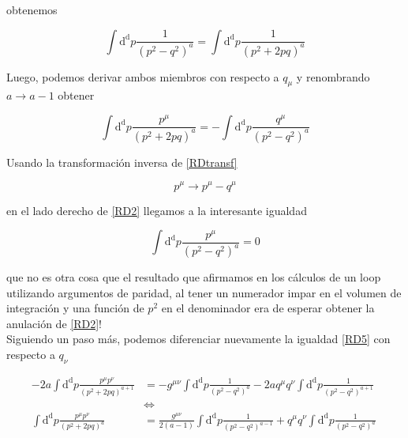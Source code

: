 \documentclass{article}
\numberwithin{equation}{section}
\begin{document}
obtenemos

\begin{equation}
\int\mathrm{d^d}p \frac{1}{\left(p^2 - q^2 \right)^a}=\int\mathrm{d^d}p \frac{1}{\left(p^2 + 2pq \right)^a}
\end{equation}

Luego, podemos derivar ambos miembros con respecto a $ q_{\mu} $ y renombrando $ a \longrightarrow a - 1 $ obtener

\begin{equation}\label{RD5}
\int\mathrm{d^d}p \frac{p^{\mu}}{\left(p^2 + 2pq\right)^a} = -\int\mathrm{d^d}p \frac{q^{\mu}}{\left(p^2 - q^2 \right)^a}
\end{equation}

Usando la transformación inversa de \ref{RDtransf}

\begin{equation}\label{RDtransfinv}
p^{\mu} \longrightarrow p^{\mu} - q^{\mu} 
\end{equation}

en el lado derecho de \ref{RD2} llegamos a la interesante igualdad

\begin{equation}\label{paridad}
\int\mathrm{d^d}p \frac{p^{\mu}}{\left(p^2 - q^2\right)^a} =0
\end{equation}

que no es otra cosa que el resultado que afirmamos en los cálculos de un loop utilizando argumentos de paridad, al tener un numerador impar en el volumen de integración y una función de $ p^2 $ en el denominador era de esperar obtener la anulación de \ref{RD2}!\\

Siguiendo un paso más, podemos diferenciar nuevamente la igualdad \ref{RD5} con respecto a $ q_{\nu} $

\begin{equation}\label{RD6}
\begin{aligned}
-2a\int\mathrm{d^d}p \frac{p^{\mu}p^{\nu}}{\left(p^2 +2pq \right)^{a+1}}&=-g^{\mu\nu}\int\mathrm{d^d}p \frac{1}{\left(p^2 -q^2\right)^a} -2a q^{\mu}q^{\nu}\int\mathrm{d^d}p \frac{1}{\left(p^2 -q^2\right)^{a+1}} \ \ \\
& \iff\\
\int\mathrm{d^d}p \frac{p^{\mu}p^{\nu}}{\left(p^2 +2pq \right)^a}&= \frac{g^{\mu\nu}}{2(a-1)}\int\mathrm{d^d}p \frac{1}{\left(p^2 -q^2\right)^{a-1}} + q^{\mu}q^{\nu}\int\mathrm{d^d}p \frac{1}{\left(p^2 -q^2\right)^a}	
\end{aligned}
\end{equation}
\end{document}
